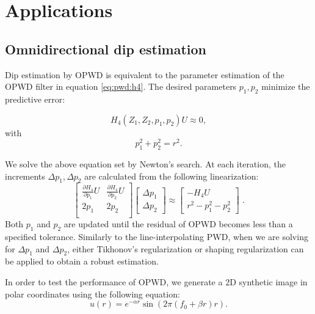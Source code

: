\section{Applications}

\subsection{Omnidirectional dip estimation}

Dip estimation by OPWD is equivalent to the parameter estimation 
of the OPWD filter in equation \ref{eq:pwd:h4}.
The desired parameters $p_1,p_2$ minimize the predictive error:


\begin{equation}
H_4(Z_1,Z_2,p_1,p_2)U \approx 0,
\end{equation}
with
\begin{equation}
p_1^2+p_2^2=r^2.
\end{equation}

We solve the above equation set by Newton's search.
At each iteration,
the increments $\Delta p_1, \Delta p_2$ are calculated 
from the following linearization:
\begin{equation}
\left[ \begin{array}{cc}
\displaystyle{\frac{\partial H_4}{\partial p_1}U} & 
\displaystyle{\frac{\partial H_4}{\partial p_2}U} \\ 
2p_1 & 2p_2 \\
\end{array}\right]
\left[ \begin{array}{c} 
\Delta p_1 \\ \Delta p_2 
\end{array}\right] \approx
\left[ \begin{array}{c} 
-H_4U \\
r^2-p_1^2-p_2^2
\end{array}\right]\;.
\end{equation} 
Both $p_1$ and $p_2$ are updated until the residual of OPWD becomes 
less than a specified tolerance.
Similarly to the line-interpolating PWD,
when we are solving for $\Delta p_1$ and $\Delta p_2$, 
either Tikhonov's regularization \cite[]{fomel:1946} or
shaping regularization \cite[]{fomel:R29} 
can be applied to obtain a robust estimation.

In order to test the performance of OPWD,
we generate a 2D synthetic image 
in polar coordinates using the following equation:
\begin{equation}\label{eq:chirp}
u(r)=e^{-\alpha r}\sin(2\pi (f_0+\beta r)r).
\end{equation}

